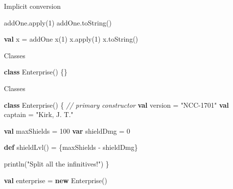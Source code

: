 \documentclass[ignorenonframetext,]{beamer}
\newenvironment{Shaded}{\begin{snugshade}}{\end{snugshade}}
\newcommand{\KeywordTok}[1]{\textcolor[rgb]{0.13,0.29,0.53}{\textbf{#1}}}
\newcommand{\DecValTok}[1]{\textcolor[rgb]{0.00,0.00,0.81}{#1}}
\newcommand{\StringTok}[1]{\textcolor[rgb]{0.31,0.60,0.02}{#1}}
\newcommand{\CommentTok}[1]{\textcolor[rgb]{0.56,0.35,0.01}{\textit{#1}}}
\newcommand{\FunctionTok}[1]{\textcolor[rgb]{0.00,0.00,0.00}{#1}}
\newcommand{\NormalTok}[1]{#1}
\begin{document}
\begin{frame}[fragile]
\begin{block}{Implicit conversion}
\begin{Shaded}
\begin{Highlighting}[]
\NormalTok{addOne.}\FunctionTok{apply}\NormalTok{(}\DecValTok{1}\NormalTok{)}
\NormalTok{addOne.}\FunctionTok{toString}\NormalTok{()}
\end{Highlighting}
\end{Shaded}

\begin{Shaded}
\begin{Highlighting}[]
\KeywordTok{val}\NormalTok{ x = addOne}
\FunctionTok{x}\NormalTok{(}\DecValTok{1}\NormalTok{)}
\NormalTok{x.}\FunctionTok{apply}\NormalTok{(}\DecValTok{1}\NormalTok{)}
\NormalTok{x.}\FunctionTok{toString}\NormalTok{()}
\end{Highlighting}
\end{Shaded}

\end{block}

\begin{block}{Classes}

\begin{Shaded}
\begin{Highlighting}[]
\KeywordTok{class} \FunctionTok{Enterprise}\NormalTok{() \{\}}
\end{Highlighting}
\end{Shaded}

\end{block}

\begin{block}{Classes}

\begin{Shaded}
\begin{Highlighting}[]
\KeywordTok{class} \FunctionTok{Enterprise}\NormalTok{() \{                        }\CommentTok{// primary constructor}
    \KeywordTok{val}\NormalTok{ version = }\StringTok{"NCC-1701"}
    \KeywordTok{val}\NormalTok{ captain = }\StringTok{"Kirk, J. T."}

    \KeywordTok{val}\NormalTok{ maxShields = }\DecValTok{100}
    \KeywordTok{var}\NormalTok{ shieldDmg = }\DecValTok{0}

    \KeywordTok{def} \FunctionTok{shieldLvl}\NormalTok{() = \{maxShields - shieldDmg\}}

    \FunctionTok{println}\NormalTok{(}\StringTok{"Split all the infinitives!"}\NormalTok{)}
\NormalTok{\}}

\KeywordTok{val}\NormalTok{ enterprise = }\KeywordTok{new} \FunctionTok{Enterprise}\NormalTok{()}
\end{Highlighting}
\end{Shaded}


\end{block}
\end{frame}
\end{document}

